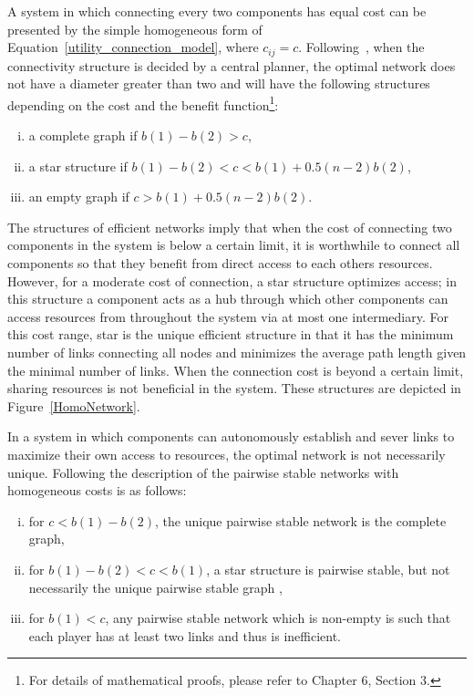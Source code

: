 \documentclass[journal,onecolumn]{IEEEtran}
\theoremstyle{plain}
\begin{document}
A system in which connecting every two components has equal cost can be presented by the simple homogeneous form of Equation~\ref{utility_connection_model}, where $c_{ij}=c$. Following~\cite{bloch2007formation}, when the connectivity structure is decided by a central planner, the optimal network does not have a diameter greater than two and will have the following structures depending on the cost and the benefit function\footnote{For details of mathematical proofs, please refer to \cite{jackson2008social} Chapter 6, Section 3.}: 
\begin{enumerate}[(i)]
\item a complete graph if $b(1)-b(2)>c$,
\item a star structure if $b(1)-b(2)<c<b(1)+0.5(n-2)b(2)$,
\item an empty graph if $c>b(1)+0.5(n-2)b(2)$.
\end{enumerate}
The structures of efficient networks imply that when the cost of connecting two components in the system is below a certain limit, it is worthwhile to connect all components so that they benefit from direct access to each others resources. However, for a moderate cost of connection, a star structure optimizes access; in this structure a component acts as a hub through which other components can access resources from throughout the system via at most one intermediary. For this cost range, star is the unique efficient structure in that it has the minimum number of links connecting all nodes and minimizes the average path length given the minimal number of links. When the connection cost is beyond a certain limit, sharing resources is not beneficial in the system. These structures are depicted in Figure~\ref{HomoNetwork}.


In a system in which components can autonomously establish and sever links to maximize their own access to resources, the optimal network is not necessarily unique. Following \cite{bloch2007formation} the description of the pairwise stable networks with homogeneous costs is as follows:

\begin{enumerate}[(i)]
\item for $c<b(1)-b(2)$, the unique pairwise stable network is the complete graph,
\item for $b(1)-b(2)<c < b(1) $, a star structure is pairwise stable, but not necessarily the unique pairwise stable graph ,
\item for $b(1)<c$, any pairwise stable network which is non-empty is such that each player has at least two links and thus is inefficient.
\end{enumerate}
\end{document}
